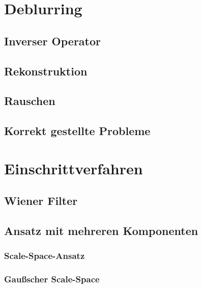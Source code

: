 \documentclass[a4paper, 11pt, accentcolor = tud3b]{tudreport}
\begin{document}
		\section{Deblurring} %

			\subsection{Inverser Operator} %

			\subsection{Rekonstruktion} %

			\subsection{Rauschen} %

			\subsection{Korrekt gestellte Probleme} %

		\section{Einschrittverfahren} %

			\subsection{Wiener Filter} %

			\subsection{Ansatz mit mehreren Komponenten} %

				\subsubsection{Scale-Space-Ansatz} %

				\subsubsection{Gaußscher Scale-Space} %
\end{document}
